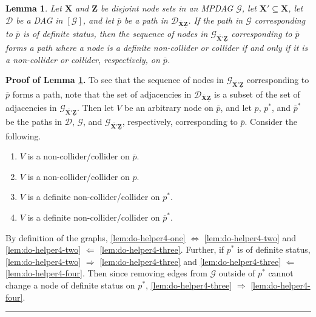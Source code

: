 \documentclass[11pt]{article}
\newcommand{\BlackBox}{\rule{1.5ex}{1.5ex}}  %
\newtheorem{lemma}[theorem]{Lemma}
\newcommand{\mb}[1]{\mathbf{#1}}
\newcommand{\g}[1][G]{\mathcal{#1}}
\newenvironment{proofof}[1][]{\noindent \textbf{Proof of #1.}}{\hfill\BlackBox}
\begin{document}

\begin{lemma}
\label{lem:do-helper4}
    Let $\mb{X}$ and $\mb{Z}$ be disjoint node sets in an MPDAG $\g$, let $\mb{X'} \subseteq \mb{X}$, let $\g[D]$ be a DAG in $[\g]$, and let $\overline{p}$ be a path in $\g[D]_{\overline{\mb{X}}\underline{\mb{Z}}}$. If the path in $\g$ corresponding to $\overline{p}$ is of definite status, then the sequence of nodes in $\g_{\overline{\mb{X'}}\underline{\mb{Z}}}$ corresponding to $\overline{p}$ forms a path where a node is a definite non-collider or collider if and only if it is a non-collider or collider, respectively, on $\overline{p}$.
\end{lemma}

\begin{proofof}[Lemma \ref{lem:do-helper4}]
    To see that the sequence of nodes in $\g_{\overline{\mb{X'}}\underline{\mb{Z}}}$ corresponding to $\overline{p}$ forms a path, note that the set of adjacencies in $\g[D]_{\overline{\mb{X}}\underline{\mb{Z}}}$ is a subset of the set of adjacencies in $\g_{\overline{\mb{X'}}\underline{\mb{Z}}}$. Then let $V$ be an arbitrary node on $\overline{p}$, and let $p$, $p^*$, and $\overline{p}^*$ be the paths in $\g[D]$, $\g$, and $\g_{\overline{\mb{X'}}\underline{\mb{Z}}}$, respectively, corresponding to $\overline{p}$. Consider the following. 
    \begin{enumerate}[label=(\alph*)]
        \item\label{lem:do-helper4-one}
        $V$ is a non-collider/collider on $\overline{p}$.
        
        \item\label{lem:do-helper4-two}
        $V$ is a non-collider/collider on $p$.

        \item\label{lem:do-helper4-three}
        $V$ is a definite non-collider/collider on $p^*$.

        \item\label{lem:do-helper4-four}
        $V$ is a definite non-collider/collider on $\overline{p}^*$.
    \end{enumerate}
    By definition of the graphs, \ref{lem:do-helper4-one} $\Leftrightarrow$ \ref{lem:do-helper4-two} and \ref{lem:do-helper4-two} $\Leftarrow$ \ref{lem:do-helper4-three}. Further, if $p^*$ is of definite status, \ref{lem:do-helper4-two} $\Rightarrow$ \ref{lem:do-helper4-three} and \ref{lem:do-helper4-three} $\Leftarrow$ \ref{lem:do-helper4-four}. Then since removing edges from $\g$ outside of $p^*$ cannot change a node of definite status on $p^*$, \ref{lem:do-helper4-three} $\Rightarrow$ \ref{lem:do-helper4-four}.
\end{proofof}
\end{document}
